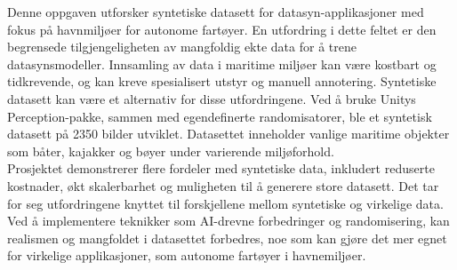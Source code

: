 

Denne oppgaven utforsker syntetiske datasett for datasyn-applikasjoner med fokus på havnmiljøer for autonome fartøyer. En utfordring i dette feltet er den begrensede tilgjengeligheten av mangfoldig ekte data for å trene datasynsmodeller. Innsamling av data i maritime miljøer kan være kostbart og tidkrevende, og kan kreve spesialisert utstyr og manuell annotering. Syntetiske datasett kan være et alternativ for disse utfordringene. Ved å bruke Unitys Perception-pakke, sammen med egendefinerte randomisatorer, ble et syntetisk datasett på 2350 bilder utviklet. Datasettet inneholder vanlige maritime objekter som båter, kajakker og bøyer under varierende miljøforhold.\\

\noindent Prosjektet demonstrerer flere fordeler med syntetiske data, inkludert reduserte kostnader, økt skalerbarhet og muligheten til å generere store datasett. Det tar for seg utfordringene knyttet til forskjellene mellom syntetiske og virkelige data. Ved å implementere teknikker som AI-drevne forbedringer og randomisering, kan realismen og mangfoldet i datasettet forbedres, noe som kan gjøre det mer egnet for virkelige applikasjoner, som autonome fartøyer i havnemiljøer.